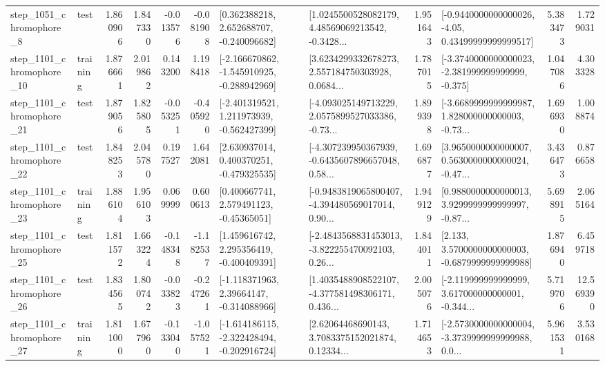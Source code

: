 \begin{tabular}{llrrrrllrlrr}
  step\_1051\_chromophore\_8 &      test &      1.860906 &    1.847330 &     -0.013576 & -0.081908 &    [0.362388218, 2.652688707, -0.240096682] &  [1.0245500528082179, 4.48569069213542, -0.3428... &       1.951643 &  [-0.9440000000000026, -4.05, 0.43499999999999517] &            5.383473 &          1.729031 \\
 step\_1101\_chromophore\_10 &  training &      1.876661 &    2.019862 &      0.143200 &  1.198418 &  [-2.166670862, -1.545910925, -0.288942969] &  [3.6234299332678273, 2.557184750303928, 0.0684... &       1.787015 &  [-3.3740000000000023, -2.381999999999999, -0.375] &            1.047086 &          4.303328 \\
 step\_1101\_chromophore\_21 &      test &      1.879056 &    1.825805 &     -0.053251 & -0.405920 &   [-2.401319521, 1.211973939, -0.562427399] &  [-4.093025149713229, 2.0575899527033386, -0.73... &       1.899398 &  [-3.6689999999999987, 1.828000000000003, -0.73... &            1.696930 &          1.008874 \\
 step\_1101\_chromophore\_22 &      test &      1.848253 &    2.045780 &      0.197527 &  1.642081 &    [2.630937014, 0.400370251, -0.479325535] &  [-4.307239950367939, -0.6435607896657048, 0.58... &       1.696877 &  [3.9650000000000007, 0.5630000000000024, -0.47... &            3.436473 &          0.876658 \\
 step\_1101\_chromophore\_23 &  training &      1.886104 &    1.956103 &      0.069999 &  0.600613 &     [0.400667741, 2.579491123, -0.45365051] &  [-0.9483819065800407, -4.394480569017014, 0.90... &       1.949129 &  [0.9880000000000013, 3.9299999999999997, -0.87... &            5.698915 &          2.065164 \\
 step\_1101\_chromophore\_25 &      test &      1.811572 &    1.663224 &     -0.148348 & -1.182537 &    [1.459616742, 2.295356419, -0.400409391] &  [-2.4843568831453013, -3.822255470092103, 0.26... &       1.844011 &   [2.133, 3.5700000000000003, -0.6879999999999988] &            1.876940 &          6.459718 \\
 step\_1101\_chromophore\_26 &      test &      1.834565 &    1.800742 &     -0.033823 & -0.247261 &    [-1.118371963, 2.39664147, -0.314088966] &  [1.4035488908522107, -4.377581498306171, 0.436... &       2.005076 &  [-2.119999999999999, 3.617000000000001, -0.344... &            5.719706 &         12.569390 \\
 step\_1101\_chromophore\_27 &  training &      1.811000 &    1.677960 &     -0.133040 & -1.057521 &  [-1.614186115, -2.322428494, -0.202916724] &  [2.62064468690143, 3.7083375152021874, 0.12334... &       1.714653 &  [-2.5730000000000004, -3.3739999999999988, 0.0... &            5.961531 &          3.530168 \\

\end{tabular}
